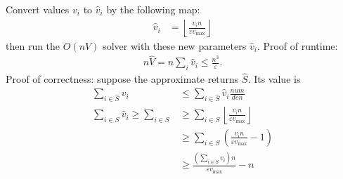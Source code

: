 Convert values \(v_i\) to \(\hat{v}_i\) by the following map:
\begin{align}
\hat{v}_i &= \left\lfloor \frac{v_i n}{\varepsilon v_\text{max}} \right\rfloor
\end{align}
then run the \(O(nV)\) solver with these  new parameters \(\hat{v}_i\).
Proof of runtime:
\begin{align}
n\hat{V} = n\sum_i \hat{v}_i \leq \frac{n^3}{\varepsilon}.
\end{align}
Proof of correctness: suppose the approximate returns \(\hat{S}\). Its value is
\begin{align}
\sum_{i \in 
	\hat{S}}
	v_i &\leq \sum_{i \in 
		\hat{S}} \hat{v}_i\frac{num}{den} \\
%	
\sum_{i \in 
	S} \hat{v}_i \geq \sum_{i\in S}
&\geq \sum_{i \in 
	S} \left\lfloor \frac{v_i n}{\varepsilon v_\text{max}}\right\rfloor \\
&\geq \sum_{i \in 
	S} \left(\frac{v_in}{\varepsilon v_\text{max}} - 1\right) \\
&\geq \frac{\left(\sum_{i\in S} v_i\right)n}{\varepsilon v_\text{max}} -n
\end{align}
